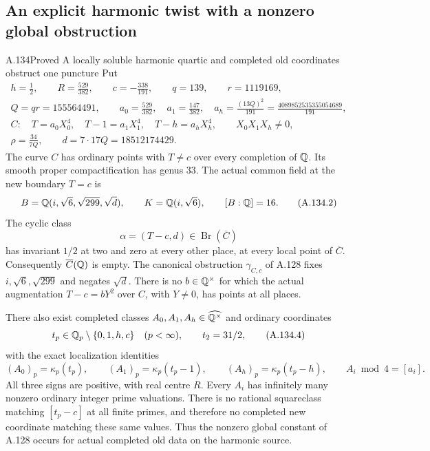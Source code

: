 \subsection{An explicit harmonic twist with a nonzero global obstruction}

\begin{statement}{A.134}{Proved}
{A locally soluble harmonic quartic and completed old coordinates obstruct one puncture}
Put
\[
 \begin{gathered}
 h=\frac12,\qquad R=\frac{529}{382},\qquad
 c=-\frac{338}{191},\qquad q=139,\qquad r=1119169,\\
 Q=qr=155564491,\qquad
 a_0=\frac{529}{382},\quad a_1=\frac{147}{382},\quad
 a_h=\frac{(13Q)^2}{191}
       =\frac{4089852535355054689}{191},\\
 C:\quad T=a_0X_0^4,\quad T-1=a_1X_1^4,\quad
 T-h=a_hX_h^4,\qquad X_0X_1X_h\ne0,\\
 \rho=\frac{34}{7Q},\qquad
 d=7\cdot17Q=18512174429.
 \end{gathered}
\tag{A.134.1}
\]
The curve $C$ has ordinary points with $T\ne c$
over every completion of $\mathbb Q$.
Its smooth proper compactification has genus $33$.
The actual common field at the new boundary $T=c$ is
\[
 B=\mathbb Q(i,\sqrt6,\sqrt{299},\sqrt d),\qquad
 K=\mathbb Q(i,\sqrt6),\qquad [B:\mathbb Q]=16.
\tag{A.134.2}
\]
The cyclic class
\[
                \alpha=(T-c,d)\in\operatorname{Br}(\overline C)
\tag{A.134.3}
\]
has invariant $1/2$ at two and zero at every other
place, at every local point of $\overline C$.
Consequently $\overline C(\mathbb Q)$ is empty.
The canonical obstruction $\gamma_{C,c}$ of A.128
fixes $i,\sqrt6,\sqrt{299}$ and negates $\sqrt d$.
There is no $b\in\mathbb Q^\times$ for which the actual
augmentation $T-c=bY^2$ over $C$, with $Y\ne0$,
has points at all places.

There also exist completed classes
$A_0,A_1,A_h\in\widehat{\mathbb Q^\times}$ and ordinary
coordinates
\[
 t_p\in\mathbb Q_p\setminus\{0,1,h,c\}\quad(p<\infty),
            \qquad t_2=31/2,
\tag{A.134.4}
\]
with the exact localization identities
\[
 (A_0)_p=\kappa_p(t_p),\qquad
 (A_1)_p=\kappa_p(t_p-1),\qquad
 (A_h)_p=\kappa_p(t_p-h),\qquad
                    A_i\bmod4=[a_i].
\tag{A.134.5}
\]
All three signs are positive, with real centre $R$.
Every $A_i$ has infinitely many nonzero ordinary
integer prime valuations.
There is no rational squareclass matching
$[t_p-c]$ at all finite primes, and therefore no
completed new coordinate matching these same values.
Thus the nonzero global constant of A.128 occurs
for actual completed old data on the harmonic source.
\end{statement}
